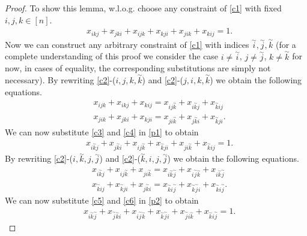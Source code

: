 \documentclass{scrartcl}
\theoremstyle{plain}
\begin{document}
\begin{proof}
	To show this lemma, w.l.o.g. choose any constraint of \eqref{c1} with fixed $i,j,k \in [n]$. 
	\begin{align}
	&x_{ikj} + x_{jki} + x_{ijk} + x_{kji} + x_{jik} + x_{kij} = 1. \label{p1}
	\end{align}
	Now we can construct any arbitrary constraint of \eqref{c1} with indices $\overset{\sim}{i},\overset{\sim}{j},\overset{\sim}{k}$ (for a complete understanding of this proof we consider the case $i \neq \overset{\sim}{i}$, $j \neq \overset{\sim}{j}$, $k \neq \overset{\sim}{k}$ for now, in cases of equality, the corresponding substitutions are simply not necessary). By rewriting \eqref{c2}-($i,j,k,\overset{\sim}{k}$) and \eqref{c2}-($j,i,k,\overset{\sim}{k}$) we obtain the following equations.
	\begin{align}
	&x_{ijk} + x_{ikj} + x_{kij} = x_{ij\overset{\sim}{k}} + x_{i\overset{\sim}{k}j} + x_{\overset{\sim}{k}ij} \label{c3}\\ 
	&x_{jik} + x_{jki} + x_{kji} = x_{ji\overset{\sim}{k}} + x_{j\overset{\sim}{k}i} + x_{\overset{\sim}{k}ji}.\label{c4}
	\end{align}
	We can now substitute \ref{c3} and \ref{c4} in \ref{p1} to obtain
	\begin{align}
	&x_{i\overset{\sim}{k}j} + x_{j\overset{\sim}{k}i} + x_{ij\overset{\sim}{k}} + x_{\overset{\sim}{k}ji} + x_{ji\overset{\sim}{k}} + x_{\overset{\sim}{k}ij} = 1. \label{p2}
	\end{align}
	By rewriting \eqref{c2}-($i,\overset{\sim}{k},j,\overset{\sim}{j}$) and \eqref{c2}-($\overset{\sim}{k},i,j,\overset{\sim}{j}$) we obtain the following equations.
	\begin{align}
	&x_{i\overset{\sim}{k}j} + x_{ij\overset{\sim}{k}} + x_{ji\overset{\sim}{k}} = x_{i\overset{\sim}{k}\overset{\sim}{j}} + x_{i\overset{\sim}{j}\overset{\sim}{k}} + x_{i\overset{\sim}{k}\overset{\sim}{j}}  \label{c5}\\ 
	&x_{\overset{\sim}{k}ij} + x_{\overset{\sim}{k}ji} + x_{j\overset{\sim}{k}i} = x_{\overset{\sim}{k}i\overset{\sim}{j}} + x_{\overset{\sim}{k}\overset{\sim}{j}i} + x_{\overset{\sim}{k}i\overset{\sim}{j}}  \label{c6}.
	\end{align}
	We can now substitute \ref{c5} and \ref{c6} in \ref{p2} to obtain
	\begin{align}
	&x_{i\overset{\sim}{k}\overset{\sim}{j}} + x_{\overset{\sim}{j}\overset{\sim}{k}i} + x_{i\overset{\sim}{j}\overset{\sim}{k}} + x_{\overset{\sim}{k}\overset{\sim}{j}i} + x_{\overset{\sim}{j}i\overset{\sim}{k}} + x_{\overset{\sim}{k}i\overset{\sim}{j}} = 1. \label{p3}

\end{align}
\end{proof}
\end{document}
